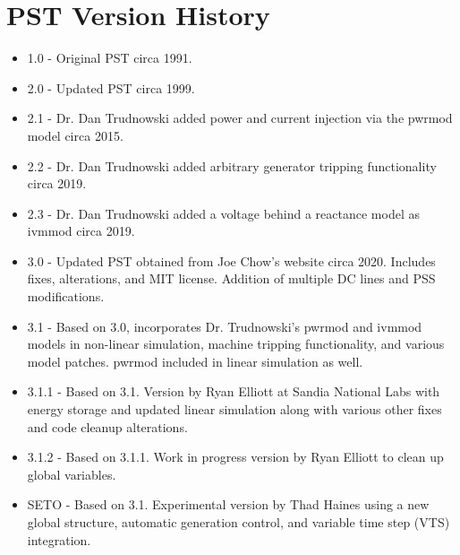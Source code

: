 \chapter{PST Version History}



\hspace{-4.2em}
\begin{minipage}{.666\linewidth}
\begin{itemize}
\raggedright
{} em
\singlespacing
\item 1.0 - Original PST circa 1991.
\item 2.0 - Updated PST circa 1999.
\item 2.1 - Dr. Dan Trudnowski added power and current injection via the pwrmod model circa 2015.
\item 2.2 - Dr. Dan Trudnowski added arbitrary generator tripping functionality circa 2019.
\item 2.3 - Dr. Dan Trudnowski added a voltage behind a reactance model as ivmmod circa 2019.
\item 3.0 - Updated PST obtained from Joe Chow's website circa 2020. 
Includes fixes, alterations, and MIT license.
Addition of multiple DC lines and PSS modifications.
\item 3.1 - Based on 3.0, incorporates Dr. Trudnowski's pwrmod and ivmmod models in non-linear simulation, machine tripping functionality, and various model patches.
pwrmod included in linear simulation as well. 
\item 3.1.1 - Based on 3.1. Version by Ryan Elliott at Sandia National Labs with energy storage and updated linear simulation along with various other fixes and code cleanup alterations. 
\item 3.1.2 - Based on 3.1.1. Work in progress version by Ryan Elliott to clean up global variables.
\item SETO - Based on 3.1. Experimental version by Thad Haines using a new global structure, automatic generation control, and variable time step (VTS) integration. 


\end{itemize}
\end{minipage}
